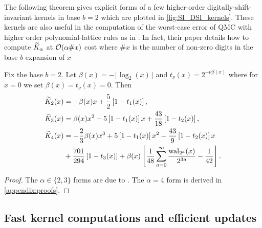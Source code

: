 \documentclass[acmsmall]{acmart}
\begin{document}
The following theorem gives explicit forms of a few higher-order digitally-shift-invariant kernels in base $b=2$ which are plotted in \cref{fig:SI_DSI_kernels}. These kernels are also useful in the computation of the worst-case error of QMC with higher order polynomial-lattice rules as in \citep{baldeaux.polylat_efficient_comp_worse_case_error_cbc}. In fact, their paper details how to compute ${\widetilde{K}}_\alpha$ at ${\mathcal{O}}(\alpha \#x)$ cost where $\#x$ is the number of non-zero digits in the base $b$ expansion of $x$
\begin{theorem} \label{thm:explicit_DSI_low_order_forms}
    Fix the base $b=2$. Let $\beta(x) = - \lfloor \log_2(x) \rfloor$ and $t_\nu(x) = 2^{-\nu \beta(x)}$ where for $x=0$ we set $\beta(x) = t_\nu(x) = 0$. Then 
    \begin{align*}
        {\widetilde{K}}_2(x) &= -\beta(x) x + \frac{5}{2}\left[1-t_1(x)\right], \\
        {\widetilde{K}}_3(x) &= \beta(x)x^2-5\left[1-t_1(x)\right]x+\frac{43}{18}\left[1-t_2(x)\right], \\
        {\widetilde{K}}_4(x) &= - \frac{2}{3}\beta(x)x^3+5\left[1-t_1(x)\right]x^2 - \frac{43}{9}\left[1-t_2(x)\right]x \\
        &+\frac{701}{294}\left[1-t_3(x)\right]+\beta(x)\left[\frac{1}{48}\sum_{a=0}^\infty \frac{\mathrm{wal}_{2^a}(x)}{2^{3a}} - \frac{1}{42}\right].
    \end{align*}
\end{theorem}
\begin{proof}
    The $\alpha \in \{2,3\}$ forms are due to \citep{baldeaux.polylat_efficient_comp_worse_case_error_cbc}. The $\alpha=4$ form is derived in \cref{appendix:proofs}. 
\end{proof}


\subsection{Fast kernel computations and efficient updates} 
\end{document}
